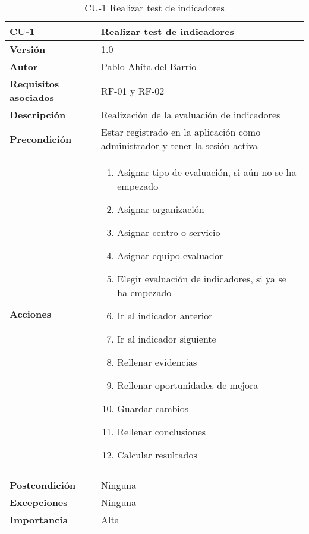 \begin{table}[p]
	\centering
	\begin{tabularx}{\linewidth}{ p{} p{} }
		\toprule
		\textbf{CU-1}    & \textbf{Realizar test de indicadores}\\
		\toprule
		\textbf{Versión}              & 1.0    \\
		\textbf{Autor}                & Pablo Ahíta del Barrio \\
		\textbf{Requisitos asociados} & RF-01 y RF-02 \\
		\textbf{Descripción}          & Realización de la evaluación de indicadores\\
		\textbf{Precondición}         & Estar registrado en la aplicación como administrador y tener la sesión activa \\
		\textbf{Acciones}             &
		\begin{enumerate}
			\def\labelenumi{\arabic{enumi}.}
			\tightlist
			\item Asignar tipo de evaluación, si aún no se ha empezado
			\item Asignar organización
			\item Asignar centro o servicio
			\item Asignar equipo evaluador
			\item Elegir evaluación de indicadores, si ya se ha empezado
			\item Ir al indicador anterior
			\item Ir al indicador siguiente
			\item Rellenar evidencias
			\item Rellenar oportunidades de mejora
			\item Guardar cambios
			\item Rellenar conclusiones
			\item Calcular resultados
		\end{enumerate}\\
		\\
		\textbf{Postcondición}        & Ninguna \\
		\textbf{Excepciones}          & Ninguna \\
		\textbf{Importancia}          & Alta \\
		\bottomrule
	\end{tabularx}
	\caption{CU-1 Realizar test de indicadores}
\end{table}

